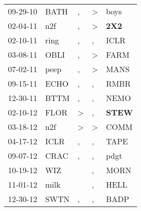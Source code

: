 \begin{supertabular}{p{0.07\textwidth}p{0.06\textwidth}p{0.02\textwidth}p{0.02\textwidth}p{0.06\textwidth}}
          09-29-10\textsuperscript{} &           BATH\textsuperscript{} &                , &     \textgreater &           boys\textsuperscript{} \\
          02-04-11\textsuperscript{} &            n2f\textsuperscript{} &                , &     \textgreater &   \textbf{2X2\textsuperscript{}} \\
          02-10-11\textsuperscript{} &           ring\textsuperscript{} &                , &                , &           ICLR\textsuperscript{} \\
          03-08-11\textsuperscript{} &           OBLI\textsuperscript{} &                , &     \textgreater &           FARM\textsuperscript{} \\
          07-02-11\textsuperscript{} &           peep\textsuperscript{} &                , &     \textgreater &           MANS\textsuperscript{} \\
          09-15-11\textsuperscript{} &           ECHO\textsuperscript{} &                , &                , &           RMBR\textsuperscript{} \\
          12-30-11\textsuperscript{} &           BTTM\textsuperscript{} &                , &                , &           NEMO\textsuperscript{} \\
          02-10-12\textsuperscript{} &           FLOR\textsuperscript{} &     \textgreater &                , &  \textbf{STEW\textsuperscript{}} \\
          03-18-12\textsuperscript{} &            n2f\textsuperscript{} &     \textgreater &     \textgreater &           COMM\textsuperscript{} \\
          04-17-12\textsuperscript{} &           ICLR\textsuperscript{} &                , &                , &           TAPE\textsuperscript{} \\
          09-07-12\textsuperscript{} &           CRAC\textsuperscript{} &                , &                , &           pdgt\textsuperscript{} \\
          10-19-12\textsuperscript{} &            WIZ\textsuperscript{} &                  &                , &           MORN\textsuperscript{} \\
          11-01-12\textsuperscript{} &           milk\textsuperscript{} &                  &                , &           HELL\textsuperscript{} \\
          12-30-12\textsuperscript{} &           SWTN\textsuperscript{} &                , &                , &           BADP\textsuperscript{} \\

\end{supertabular}
